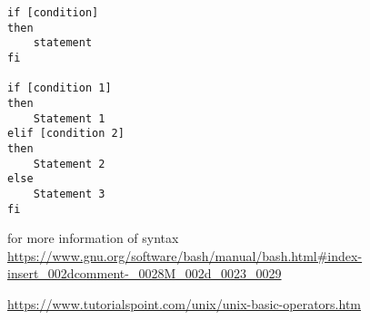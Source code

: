 \documentclass[12pt]{article}
\begin{document}
\lstset{language=sh}
\begin{lstlisting} 
if [condition]
then
    statement 
fi

if [condition 1]
then 
    Statement 1
elif [condition 2]
then
    Statement 2
else 
    Statement 3
fi

\end{lstlisting}


for more information of syntax
{\url{https://www.gnu.org/software/bash/manual/bash.html#index-insert_002dcomment-_0028M_002d_0023_0029}}

{\url{https://www.tutorialspoint.com/unix/unix-basic-operators.htm}}
\end{document}
